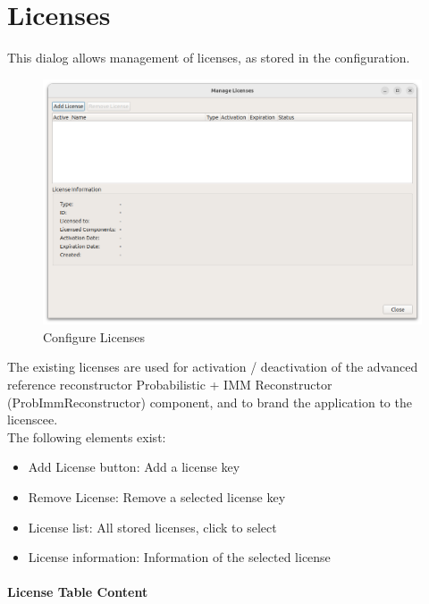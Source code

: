 \section{Licenses}
\label{sec:ui_configure_licenses}


This dialog allows management of licenses, as stored in the configuration. \\

\begin{figure}[H]
\hspace*{-1cm}
    \includegraphics[width=17cm]{figures/configure_licenses.png}
  \caption{Configure Licenses}
\end{figure}

The existing licenses are used for activation / deactivation of the advanced reference reconstructor Probabilistic + IMM Reconstructor (ProbImmReconstructor) component, and to brand the application to the licenscee. 
\ \\

The following elements exist:

\begin{itemize}
\item Add License button: Add a license key 
\item Remove License: Remove a selected license key
\item License list: All stored licenses, click to select
\item License information: Information of the selected license
\end{itemize}

\paragraph {License Table Content}

